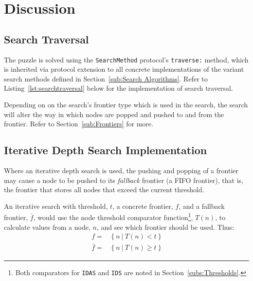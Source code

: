 \section{Discussion}
\label{sec:Discussion}

\subsection{Search Traversal}
\label{sub:Search Traversal}

The puzzle is solved using the \texttt{SearchMethod} protocol's
\texttt{traverse:} method, which is inherited via protocol extension to all
concrete implementations of the variant search methods defined in
Section~\ref{sub:Search Algorithms}. Refer to Listing~\ref{lst:searchtraversal}
below for the implementation of search traversal.

Depending on on the search's frontier type which is used in the search, the
search will alter the way in which nodes are popped and pushed to and from the
frontier. Refer to Section~\ref{sub:Frontiers} for more.



\subsection{Iterative Depth Search Implementation}
\label{sub:Iterative Depth Search Implementation}

Where an iterative depth search is used, the pushing and popping of a frontier
may cause a node to be pushed to its \emph{fallback} frontier (a FIFO frontier),
that is, the frontier that stores all nodes that exceed the current threshold.

An iterative search with threshold, $t$, a concrete frontier, $f$, and a
fallback frontier, $\bar{f}$, would use the node threshold comparator
function\footnote{Both comparators for \texttt{IDAS} and \texttt{IDS} are noted
in Section~\ref{subs:Thresholds}.}, $T(n)$, to calculate values from a node,
$n$, and see which frontier should be used. Thus:
\begin{align}\label{eq:frontiercalc}
        f =& \ \{ \ n \ | \ T(n) < t    \ \}     \\
  \bar{f} =& \ \{ \ n \ | \ T(n) \geq t \ \}
\end{align}

